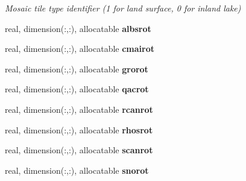 \begin{DoxyCompactItemize}
\begin{DoxyCompactList}\small\item\em Mosaic tile type identifier (1 for land surface, 0 for inland lake) \end{DoxyCompactList}\item 
\hypertarget{structclass__statevars_1_1class__rotated_a18c99a9e9c8323f3646e3cfdc5fa4339}{}real, dimension(\+:,\+:), allocatable {\bfseries albsrot}\label{structclass__statevars_1_1class__rotated_a18c99a9e9c8323f3646e3cfdc5fa4339}

\item 
\hypertarget{structclass__statevars_1_1class__rotated_addbc67f5a58b2315889327ccc5f92504}{}real, dimension(\+:,\+:), allocatable {\bfseries cmairot}\label{structclass__statevars_1_1class__rotated_addbc67f5a58b2315889327ccc5f92504}

\item 
\hypertarget{structclass__statevars_1_1class__rotated_aeb351764f34e24b06f56794315ec730c}{}real, dimension(\+:,\+:), allocatable {\bfseries grorot}\label{structclass__statevars_1_1class__rotated_aeb351764f34e24b06f56794315ec730c}

\item 
\hypertarget{structclass__statevars_1_1class__rotated_a4bdcbbb95920085a847d94cfbe75f9b3}{}real, dimension(\+:,\+:), allocatable {\bfseries qacrot}\label{structclass__statevars_1_1class__rotated_a4bdcbbb95920085a847d94cfbe75f9b3}

\item 
\hypertarget{structclass__statevars_1_1class__rotated_a73fe243fa4523cdb0fd0bd50a2cdf2f9}{}real, dimension(\+:,\+:), allocatable {\bfseries rcanrot}\label{structclass__statevars_1_1class__rotated_a73fe243fa4523cdb0fd0bd50a2cdf2f9}

\item 
\hypertarget{structclass__statevars_1_1class__rotated_aea3a3f95157feb3817a192437d5635f8}{}real, dimension(\+:,\+:), allocatable {\bfseries rhosrot}\label{structclass__statevars_1_1class__rotated_aea3a3f95157feb3817a192437d5635f8}

\item 
\hypertarget{structclass__statevars_1_1class__rotated_aed7d131b46c6b2b1772af4dffd7bbb80}{}real, dimension(\+:,\+:), allocatable {\bfseries scanrot}\label{structclass__statevars_1_1class__rotated_aed7d131b46c6b2b1772af4dffd7bbb80}

\item 
\hypertarget{structclass__statevars_1_1class__rotated_a292b30d0c4c6a3cbac2c619a9f66250b}{}real, dimension(\+:,\+:), allocatable {\bfseries snorot}\label{structclass__statevars_1_1class__rotated_a292b30d0c4c6a3cbac2c619a9f66250b}


\end{DoxyCompactItemize}
